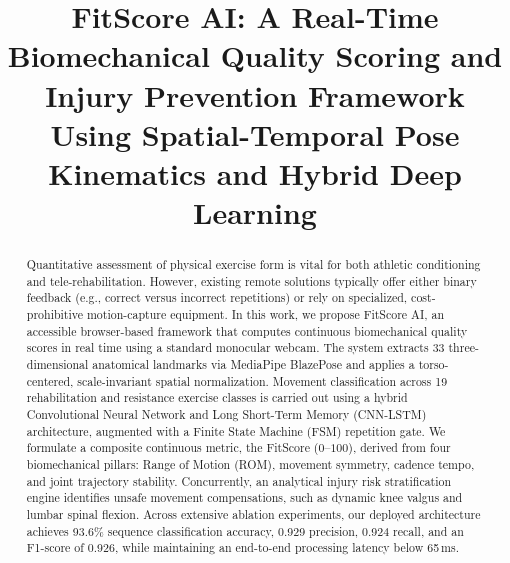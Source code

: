 \documentclass[conference]{IEEEtran}
\begin{document}
\title{FitScore AI: A Real-Time Biomechanical Quality Scoring and Injury Prevention Framework Using Spatial-Temporal Pose Kinematics and Hybrid Deep Learning}

\author{
}

\maketitle

\begin{abstract}
Quantitative assessment of physical exercise form is vital for both athletic conditioning and tele-rehabilitation. However, existing remote solutions typically offer either binary feedback (e.g., correct versus incorrect repetitions) or rely on specialized, cost-prohibitive motion-capture equipment. In this work, we propose FitScore AI, an accessible browser-based framework that computes continuous biomechanical quality scores in real time using a standard monocular webcam. The system extracts 33 three-dimensional anatomical landmarks via MediaPipe BlazePose and applies a torso-centered, scale-invariant spatial normalization. Movement classification across 19 rehabilitation and resistance exercise classes is carried out using a hybrid Convolutional Neural Network and Long Short-Term Memory (CNN-LSTM) architecture, augmented with a Finite State Machine (FSM) repetition gate. We formulate a composite continuous metric, the FitScore ($0$--$100$), derived from four biomechanical pillars: Range of Motion (ROM), movement symmetry, cadence tempo, and joint trajectory stability. Concurrently, an analytical injury risk stratification engine identifies unsafe movement compensations, such as dynamic knee valgus and lumbar spinal flexion. Across extensive ablation experiments, our deployed architecture achieves 93.6\% sequence classification accuracy, 0.929 precision, 0.924 recall, and an F1-score of 0.926, while maintaining an end-to-end processing latency below 65\,ms.
\end{abstract}
\end{document}
